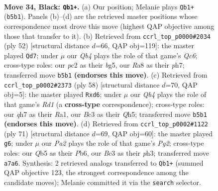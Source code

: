 \documentclass[11pt]{article}
\begin{document}
\clearpage

\begin{figure}[p]\centering
\begin{subfigure}{0.46\textwidth}\centering
\resizebox{\linewidth}{!}{%
\newchessgame
\chessboard[
  setfen={r7/p6Q/2k1p3/pq1p4/3r2P1/2bR4/2P5/3K4 b - - 1 34},
  showmover=false,
  pgfstyle=straightmove, color=movearrow, markmove={b5-b1}
]}
\caption{}
\end{subfigure}\hfill
\begin{subfigure}{0.46\textwidth}\centering
\resizebox{\linewidth}{!}{%
\newchessgame
\chessboard[
  setfen={4Rr1k/5B1p/p1Q3p1/6b1/1q1P4/5P2/5P1P/6K1 w - - 0 27},
  showmover=false,
  pgfstyle=straightmove, color=movearrow, markmove={c6-d7}
]}
\caption{}
\end{subfigure}
\\[4pt]
\begin{subfigure}{0.46\textwidth}\centering
\resizebox{\linewidth}{!}{%
\newchessgame
\chessboard[
  setfen={6k1/3q1pp1/3r4/7Q/P1r5/1p4P1/5P1P/R2R2K1 w - - 0 30},
  showmover=false,
  pgfstyle=straightmove, color=movearrow, markmove={d1-d6}
]}
\caption{}
\end{subfigure}\hfill
\begin{subfigure}{0.46\textwidth}\centering
\resizebox{\linewidth}{!}{%
\newchessgame
\chessboard[
  setfen={3Rr1k1/5pp1/1p2q2p/1P6/5P2/7P/6PK/3Q4 b - - 0 36},
  showmover=false,
  pgfstyle=straightmove, color=movearrow, markmove={g7-g6}
]}
\caption{}
\end{subfigure}
\caption{\textbf{Move 34, Black: \texttt{Qb1+}.} (a) Our position; Melanie plays \texttt{Qb1+} (\texttt{b5b1}). Panels (b)--(d) are the retrieved master positions whose correspondence most drove this move (highest QAP objective among those that transfer to it). (b) Retrieved from \texttt{ccrl\_top\_p0000\#2034} (ply 52) [structural distance $d$=66, QAP obj=119]: the master played \texttt{Qd7}; under $\mu$ our \emph{Qb4} plays the role of that game's \emph{Qc6}; cross-type roles: our \emph{p}c2 as their \emph{b}g5, our \emph{R}a8 as their \emph{p}h7; transferred move \texttt{b5b1} \textbf{(endorses this move)}. (c) Retrieved from \texttt{ccrl\_top\_p0002\#2373} (ply 58) [structural distance $d$=70, QAP obj=5]: the master played \texttt{Rxd6}; under $\mu$ our \emph{Qb4} plays the role of that game's \emph{Rd1} (a \textbf{cross-type} correspondence); cross-type roles: our \emph{q}h7 as their \emph{R}a1, our \emph{B}c3 as their \emph{Q}h5; transferred move \texttt{b5b1} \textbf{(endorses this move)}. (d) Retrieved from \texttt{ccrl\_top\_p0002\#1122} (ply 71) [structural distance $d$=69, QAP obj=60]: the master played \texttt{g6}; under $\mu$ our \emph{Pa2} plays the role of that game's \emph{Pg2}; cross-type roles: our \emph{Q}b5 as their \emph{P}b6, our \emph{B}c3 as their \emph{p}h3; transferred move \texttt{a7a6}. Synthesis: 2 retrieved analogs transferred to \texttt{Qb1+} (summed QAP objective 123, the strongest correspondence among the candidate moves); Melanie committed it via the \texttt{search} selector.}
\label{fig:thought-m67}
\end{figure}
\end{document}

